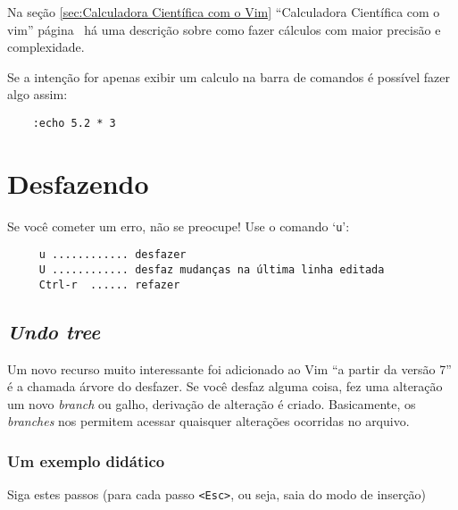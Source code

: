{\Large {}} Na seção \ref{sec:Calculadora Científica com o Vim}
``Calculadora Científica com o vim'' página~\pageref{sec:Calculadora Científica com
o Vim} há uma descrição sobre como fazer cálculos com maior precisão e
complexidade.

{\Large {}} Se a intenção for apenas exibir um calculo na barra de comandos
é possível fazer algo assim:

\begin{verbatim}
    :echo 5.2 * 3
\end{verbatim}

\section{Desfazendo}
\label{Desfazendo}

Se você cometer um erro, não se preocupe! Use o comando `{\tt u}':

\begin{verbatim}
     u ............ desfazer
     U ............ desfaz mudanças na última linha editada
     Ctrl-r  ...... refazer
\end{verbatim}

\subsection{{\em Undo tree}}
\label{Undo tree}

Um novo recurso muito interessante foi adicionado ao Vim ``a partir da
versão 7''  é a chamada árvore do desfazer.  Se
você desfaz alguma coisa, fez uma alteração um novo {\em branch} ou
galho, derivação de alteração é criado.  Basicamente, os {\em branches}
nos permitem acessar quaisquer alterações ocorridas no arquivo.

\subsubsection{Um exemplo didático}
\label{Um exemplo didático}

Siga estes passos (para cada passo \verb|<Esc>|, ou seja, saia do modo
de inserção)

